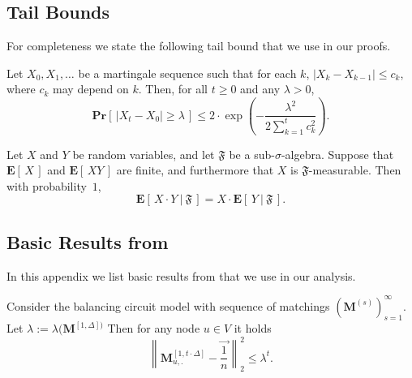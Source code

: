 \documentclass[twoside,leqno]{article}
\newcommand{\Pro}[1]{\mathbf{Pr} \left[\,#1\,\right]}
\newcommand{\Ex}[1]{\mathbf{E} \left[\,#1\,\right]}
\newcommand{\M}{\mathbf{M}}
\DeclareMathOperator{\1}{\mathbf{1}}
\numberwithin{equation}{section}
\begin{document}
\subsection{Tail Bounds}

For completeness we state the following tail bound that we use in our proofs.

\begin{theorem}
\label{thm:MethodOfBoundedDifferences}
Let $X_0, X_1, \ldots$ be a martingale sequence such that for each $k$, $|X_k - X_{k-1}| \le c_k$, where $c_k$ may depend on $k$. Then, for all $t\ge 0$ and any $\lambda>0$,
\[\Pro{\lvert X_t-X_0 \rvert \ge \lambda} \le 2\cdot \exp\left(- \frac{\lambda^2}{2\sum_{k=1}^t c_{k}^2}\right).\]
\end{theorem}


\begin{lemma}\label{lem:take-out-what-is-known}
Let $X$ and $Y$ be random variables, and let $\mathfrak{F}$ be a sub-$\sigma$-algebra. Suppose that $\Ex{X}$ and $\Ex{XY}$ are finite, and furthermore that $X$ is $\mathfrak{F}$-measurable. Then with probability~$1$,
\[ \Ex{X \cdot Y~\Big|~\mathfrak{F}} = X \cdot \Ex{Y~\Big|~\mathfrak{F}}.
\]
\end{lemma}


\subsection{Basic Results from \cite{DBLP:conf/focs/SauerwaldS12}}

In this appendix we list basic results from \cite{DBLP:conf/focs/SauerwaldS12} that we use in our analysis.








\begin{lemma}\label{lem:prob:BalancingCircuit}
Consider the balancing circuit model with sequence of matchings $\left(\M^{(s)}\right)_{s=1}^{\infty}$. Let $\lambda:=\lambda(\M^{[1,\Delta])}$ Then for any node $u\in V$ it holds
\[
\left\|\M_{u,.}^{[1,t\cdot \Delta]} - \vec{ \frac{1}{n}} \right\|_2^2 \le \lambda^{t}.
\]
\end{lemma}
\end{document}
